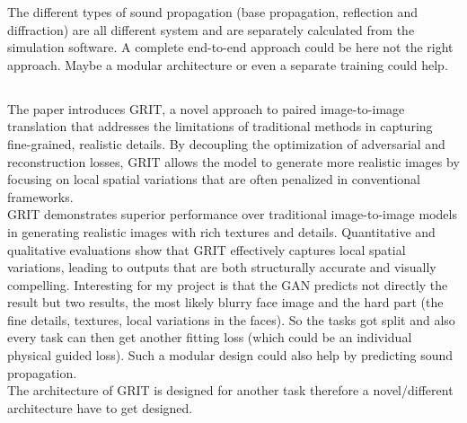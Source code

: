 			The different types of sound propagation (base propagation, reflection and diffraction) are all different system and are separately calculated from the simulation software. A complete end-to-end approach could be here not the right approach. Maybe a modular architecture or even a separate training could help.
			
		\subsection{}
			The paper introduces GRIT, a novel approach to paired image-to-image translation that addresses the limitations of traditional methods in capturing fine-grained, realistic details. By decoupling the optimization of adversarial and reconstruction losses, GRIT allows the model to generate more realistic images by focusing on local spatial variations that are often penalized in conventional frameworks.\\
			GRIT demonstrates superior performance over traditional image-to-image models in generating realistic images with rich textures and details. Quantitative and qualitative evaluations show that GRIT effectively captures local spatial variations, leading to outputs that are both structurally accurate and visually compelling.
			\clearpage
			Interesting for my project is that the GAN predicts not directly the result but two results, the most likely blurry face image and the hard part (the fine details, textures, local variations in the faces). So the tasks got split and also every task can then get another fitting loss (which could be an individual physical guided loss). Such a modular design could also help by predicting sound propagation.\\
			The architecture of GRIT is designed for another task therefore a novel/different architecture have to get designed.
			

